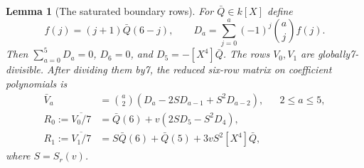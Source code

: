 \documentclass[11pt]{article}
\newtheorem{lemma}{Lemma}
\begin{document}
\begin{lemma}[The saturated boundary rows]\label{lem:rows}
For $\bar Q\in k[X]$ define
\[
 f(j)=(j+1)\bar Q(6-j),\qquad
 D_a=\sum_{j=0}^a(-1)^j\binom aj f(j).
\]
Then $\sum_{a=0}^5D_a=0$, $D_6=0$, and
$D_5=-[X^4]\bar Q$.
The rows $V_0,V_1$ are globally7-divisible. After dividing them
by7, the reduced six-row matrix on coefficient polynomials is
\[
 \begin{aligned}
 \bar V_a&=\binom a2(D_a-2SD_{a-1}+S^2D_{a-2}),
                                      &&2\le a\le5,\\
 R_0:=\overline{V_0/7}
      &=\bar Q(6)+v(2SD_5-S^2D_4),\\
 R_1:=\overline{V_1/7}
      &=S\bar Q(6)+\bar Q(5)+3vS^2[X^4]\bar Q ,
 \end{aligned}                                                   \tag{6}
\]
where $S=S_r(v)$.
\end{lemma}
\end{document}
